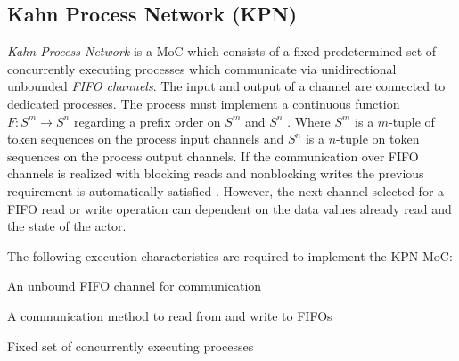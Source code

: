 \subsection{Kahn Process Network (KPN)}
\emph{Kahn Process Network} \cite{kahn:1974} is a MoC
which consists of a fixed predetermined set of
concurrently executing processes which communicate via unidirectional
unbounded \emph{FIFO channels}. The input and output of a channel
are connected to dedicated processes. The process must implement
a continuous function $F: S^m \to S^n$ regarding a prefix order on
$S^m$ and $S^n$ \cite{kahn:1974,stark87concurrent:1987}.
Where $S^m$ is a $m$-tuple of token sequences on the process input channels
and $S^n$ is a $n$-tuple on token sequences on the process output channels.
If the communication over FIFO channels is realized with blocking
reads and nonblocking writes the previous requirement is automatically
satisfied \cite{stark87concurrent:1987}. However, the next channel
selected for a FIFO read or write operation can dependent on
the data values already read and the state of the actor.


The following execution characteristics are required to
implement the KPN MoC:

\begin{characteristic}\label{characteristic-kpn-fifo}
  An unbound FIFO channel for communication
\end{characteristic}

\begin{characteristic}\label{characteristic-kpn-fifo-read-write}
  A communication method to read from and write to FIFOs
\end{characteristic}

\begin{characteristic}\label{characteristic-kpn-concurrent-processes}
  Fixed set of concurrently executing processes
\end{characteristic}

